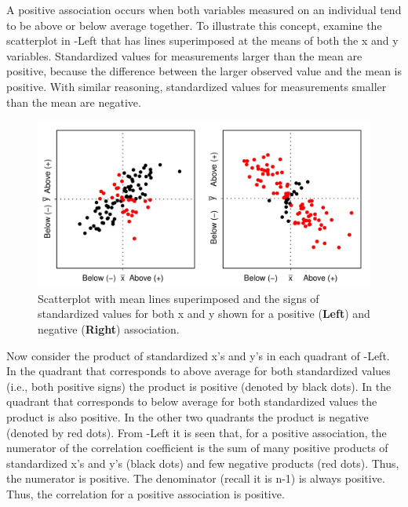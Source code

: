 \documentclass[10pt,openany]{book}\usepackage[]{graphicx}\usepackage[]{color}
\newenvironment{knitrout}{}{} %
\begin{document}
A positive association occurs when both variables measured on an individual tend to be above or below average together.  To illustrate this concept, examine the scatterplot in -Left that has lines superimposed at the means of both the x and y variables.  Standardized values for measurements larger than the mean are positive, because the difference between the larger observed value and the mean is positive.  With similar reasoning, standardized values for measurements smaller than the mean are negative.

\begin{knitrout}
\color{fgcolor}\begin{figure}[hbtp]

{\centering \includegraphics[width=.8\linewidth]{Figs/corrdefn1-1} 

}

\caption[Scatterplot with mean lines superimposed and the signs of standardized values for both x and y shown for a positive (\textbf{Left}) and negative (\textbf{Right}) association]{Scatterplot with mean lines superimposed and the signs of standardized values for both x and y shown for a positive (\textbf{Left}) and negative (\textbf{Right}) association.}\label{fig:corrdefn1}
\end{figure}


\end{knitrout}

Now consider the product of standardized x's and y's in each quadrant of -Left.  In the quadrant that corresponds to above average for both standardized values (i.e., both positive signs) the product is positive (denoted by black dots).  In the quadrant that corresponds to below average for both standardized values the product is also positive.  In the other two quadrants the product is negative (denoted by red dots).  From -Left it is seen that, for a positive association, the numerator of the correlation coefficient is the sum of many positive products of standardized x's and y's (black dots) and few negative products (red dots).  Thus, the numerator is positive.  The denominator (recall it is n-1) is always positive.  Thus, the correlation for a positive association is positive.
\end{document}
